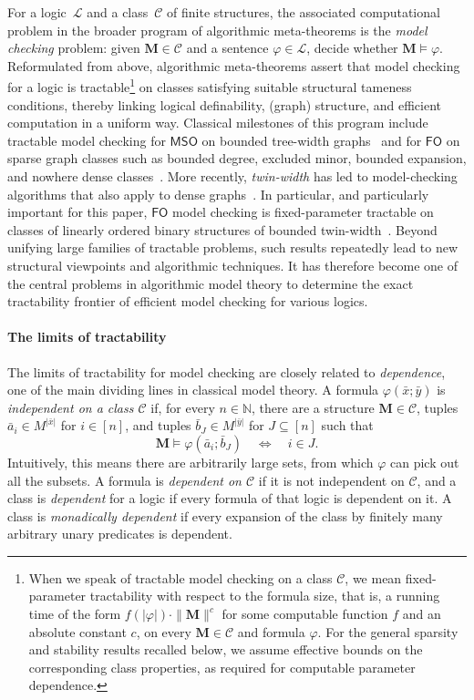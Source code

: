 \documentclass[1p,number,11pt]{elsarticle}
\renewcommand{\phi}{\varphi}
\theoremstyle{plain}
\newcommand{\Cc}{\mathscr{C}}
\renewcommand{\FO}{\ensuremath{\mathsf{FO}}}
\newcommand{\MSO}{\ensuremath{\mathsf{MSO}}}
\begin{document}
For a logic~$\mathcal L$ and a class~$\Cc$ of finite structures, the associated computational problem in the broader program of algorithmic meta-theorems is the \emph{model checking} problem: given
$\mathbf M\in\Cc$ and a sentence $\varphi\in\mathcal L$, decide whether
$\mathbf M\models\varphi$.
Reformulated from above, algorithmic meta-theorems assert that model checking for a logic is tractable\footnote{When we speak of tractable model checking on a class $\Cc$, we mean fixed-parameter tractability with respect to the formula size, that is, a running time of the form $f(|\phi|)\cdot \|\mathbf M\|^c$ for some computable function $f$ and an absolute constant $c$, on every $\mathbf M\in \Cc$ and formula $\phi$.
For the general sparsity and stability results recalled below, we assume effective bounds on the corresponding class properties, as required for computable parameter dependence.}  on classes satisfying suitable structural tameness conditions, thereby linking logical definability, (graph) structure, and efficient computation in a uniform way.
Classical milestones of this program include tractable
model checking for $\MSO$ on bounded tree-width graphs~\cite{arnborg1991,courcelle1990,courcelle1993} and for $\FO$ on sparse graph classes such as bounded degree, excluded minor, bounded expansion, and nowhere dense classes~\cite{seese1996,frick2001,dvorak2013,grohe2017}.
More recently, \emph{twin-width} has led to model-checking algorithms that also apply to dense graphs~\cite{bonnet2022twwI}. In particular, and particularly important for this paper, $\FO$ model checking is fixed-parameter tractable on classes of linearly ordered binary structures of bounded twin-width~\cite{bonnet2024twin}.
Beyond unifying large families of tractable problems, such results repeatedly lead to new structural viewpoints and algorithmic techniques.
It has therefore become one of the central problems in algorithmic model theory to determine the exact tractability frontier of efficient model checking for various logics.

\paragraph{The limits of tractability}
The limits of tractability for model checking are closely related to \emph{dependence}, one of the main dividing lines in classical model theory. 
A formula $\varphi(\bar x;\bar y)$ is \emph{independent on a class $\Cc$} if, for every $n\in\mathbb N$, there are a structure $\mathbf M\in\Cc$, tuples $\bar a_i\in M^{|\bar x|}$ for $i\in[n]$, and tuples $\bar b_J\in M^{|\bar y|}$ for $J\subseteq[n]$ such that
\[
 \mathbf M\models\varphi(\bar a_i;\bar b_J)
 \quad\Longleftrightarrow\quad i\in J.
\]
Intuitively, this means there are arbitrarily large sets, from which $\phi$ can pick out all the subsets. 
A formula is \emph{dependent on $\Cc$} if it is not independent on $\Cc$, and a class is \emph{dependent} for a logic if every formula of that logic is dependent on it. 
A class is \emph{monadically dependent} if every expansion of the class by finitely many arbitrary unary predicates is dependent. 
\end{document}
